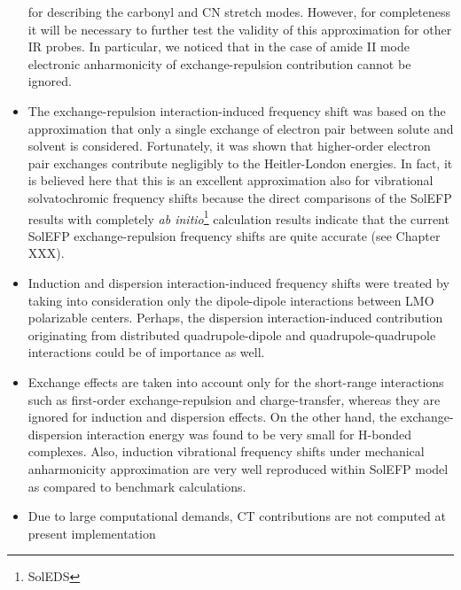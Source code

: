 \documentclass[a4paper,titlepage,twoside,fleqn,12pt]{book}
\begin{document}
\begin{refsection}
\begin{itemize}
for describing the carbonyl and CN stretch modes.\citep{Blasiak.Cho.JCP.2014,Blasiak.Cho.JCP.2015,
Blasiak.Ritchie.Webb.Cho.XXX.2016}
However, for completeness it will be necessary to further test the validity of this approximation 
for other IR probes. In particular, we noticed that in the case of amide II mode
electronic anharmonicity of exchange\hyp{}repulsion contribution cannot be ignored.\citep{Blasiak.Cho.JCP.2015}
 \item The exchange\hyp{}repulsion interaction\hyp{}induced frequency shift was based on the approximation 
that only a single exchange of electron pair between solute and solvent is considered. 
Fortunately, it was shown that higher\hyp{}order electron pair exchanges contribute
negligibly to the Heitler\hyp{}London energies.\citep{Korona.Williams.Bukowski.Jeziorski.Szalewicz.JCP.1997}
In fact, it is believed here that this is an excellent approximation also for vibrational
solvatochromic frequency shifts because the direct comparisons 
of the SolEFP results with completely \emph{ab initio}\footnote{SolEDS} calculation results indicate 
that the current SolEFP exchange\hyp{}repulsion frequency shifts are quite accurate (see
Chapter XXX).%
 \item Induction and dispersion interaction\hyp{}induced frequency shifts 
were treated by taking into consideration only the dipole\hyp{}dipole interactions 
between LMO polarizable centers. Perhaps, the dispersion interaction\hyp{}induced 
contribution originating from distributed quadrupole\hyp{}dipole and quadrupole\hyp{}quadrupole 
interactions could be of importance as well.
 \item Exchange effects are taken into account only for the short\hyp{}range
interactions such as first\hyp{}order exchange\hyp{}repulsion and charge\hyp{}transfer, whereas 
they are ignored for induction and dispersion effects. On the other hand,
the exchange\hyp{}dispersion interaction energy was found to be very small
for H-bonded complexes.\citep{Langlet.Caillet.Caffarel.JCP.1995,
Zierkiewicz.Jurecka.Hobza.ChemPhysChem.2005,Cybulski.Sadlej.JCTC.2008} 
Also, induction vibrational frequency shifts
under mechanical anharmonicity approximation
are very well reproduced within SolEFP model as compared to benchmark 
calculations.\citep{Blasiak.Cho.JCP.2014,Blasiak.Cho.JCP.2015,
Blasiak.Ritchie.Webb.Cho.XXX.2016,Blasiak.Maj.Cho.XXX.2016}
 \item Due to
large computational demands, CT contributions are not computed at present implementation

\end{itemize}
\end{refsection}
\end{document}

